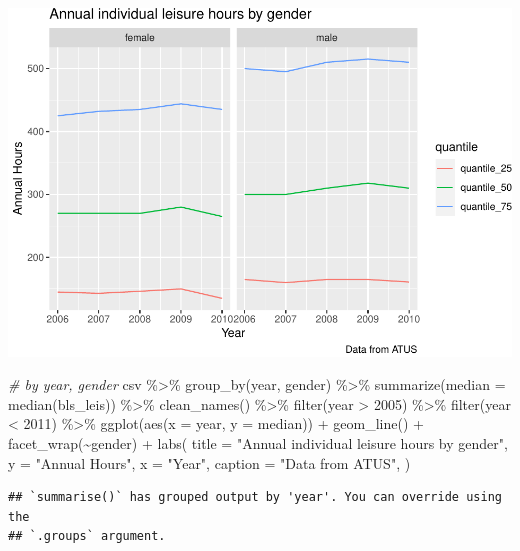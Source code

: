 \documentclass[
]{article}
\newenvironment{Shaded}{\begin{snugshade}}{\end{snugshade}}
\newcommand{\AttributeTok}[1]{\textcolor[rgb]{0.77,0.63,0.00}{#1}}
\newcommand{\CommentTok}[1]{\textcolor[rgb]{0.56,0.35,0.01}{\textit{#1}}}
\newcommand{\DecValTok}[1]{\textcolor[rgb]{0.00,0.00,0.81}{#1}}
\newcommand{\FunctionTok}[1]{\textcolor[rgb]{0.00,0.00,0.00}{#1}}
\newcommand{\NormalTok}[1]{#1}
\newcommand{\SpecialCharTok}[1]{\textcolor[rgb]{0.00,0.00,0.00}{#1}}
\newcommand{\StringTok}[1]{\textcolor[rgb]{0.31,0.60,0.02}{#1}}
\begin{document}
\includegraphics{Paper2_files/figure-latex/graphs-9.pdf}

\begin{Shaded}
\begin{Highlighting}[]
\CommentTok{\# by year, gender}
\NormalTok{csv }\SpecialCharTok{\%\textgreater{}\%}
  \FunctionTok{group\_by}\NormalTok{(year, gender) }\SpecialCharTok{\%\textgreater{}\%}
  \FunctionTok{summarize}\NormalTok{(}\AttributeTok{median =} \FunctionTok{median}\NormalTok{(bls\_leis)) }\SpecialCharTok{\%\textgreater{}\%}
  \FunctionTok{clean\_names}\NormalTok{() }\SpecialCharTok{\%\textgreater{}\%}
  \FunctionTok{filter}\NormalTok{(year }\SpecialCharTok{\textgreater{}} \DecValTok{2005}\NormalTok{) }\SpecialCharTok{\%\textgreater{}\%}
  \FunctionTok{filter}\NormalTok{(year }\SpecialCharTok{\textless{}} \DecValTok{2011}\NormalTok{) }\SpecialCharTok{\%\textgreater{}\%}
  \FunctionTok{ggplot}\NormalTok{(}\FunctionTok{aes}\NormalTok{(}\AttributeTok{x =}\NormalTok{ year, }\AttributeTok{y =}\NormalTok{ median)) }\SpecialCharTok{+}
  \FunctionTok{geom\_line}\NormalTok{() }\SpecialCharTok{+}
  \FunctionTok{facet\_wrap}\NormalTok{(}\SpecialCharTok{\textasciitilde{}}\NormalTok{gender) }\SpecialCharTok{+}
      \FunctionTok{labs}\NormalTok{(}
  \AttributeTok{title =} \StringTok{"Annual individual leisure hours by gender"}\NormalTok{,}
  \AttributeTok{y =} \StringTok{"Annual Hours"}\NormalTok{,}
  \AttributeTok{x =} \StringTok{"Year"}\NormalTok{,}
  \AttributeTok{caption =} \StringTok{"Data from ATUS"}\NormalTok{,}
\NormalTok{) }
\end{Highlighting}
\end{Shaded}

\begin{verbatim}
## `summarise()` has grouped output by 'year'. You can override using the
## `.groups` argument.
\end{verbatim}
\end{document}
